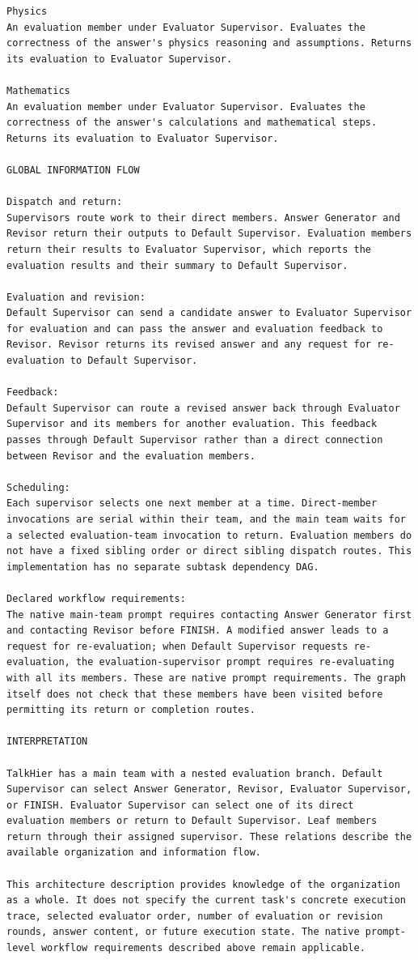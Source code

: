 \documentclass[10pt,letterpaper,twocolumn]{article}
\begin{document}
\begin{Verbatim}[fontsize=\small,breaklines=true,breakanywhere=true]
Physics
An evaluation member under Evaluator Supervisor. Evaluates the correctness of the answer's physics reasoning and assumptions. Returns its evaluation to Evaluator Supervisor.

Mathematics
An evaluation member under Evaluator Supervisor. Evaluates the correctness of the answer's calculations and mathematical steps. Returns its evaluation to Evaluator Supervisor.

GLOBAL INFORMATION FLOW

Dispatch and return:
Supervisors route work to their direct members. Answer Generator and Revisor return their outputs to Default Supervisor. Evaluation members return their results to Evaluator Supervisor, which reports the evaluation results and their summary to Default Supervisor.

Evaluation and revision:
Default Supervisor can send a candidate answer to Evaluator Supervisor for evaluation and can pass the answer and evaluation feedback to Revisor. Revisor returns its revised answer and any request for re-evaluation to Default Supervisor.

Feedback:
Default Supervisor can route a revised answer back through Evaluator Supervisor and its members for another evaluation. This feedback passes through Default Supervisor rather than a direct connection between Revisor and the evaluation members.

Scheduling:
Each supervisor selects one next member at a time. Direct-member invocations are serial within their team, and the main team waits for a selected evaluation-team invocation to return. Evaluation members do not have a fixed sibling order or direct sibling dispatch routes. This implementation has no separate subtask dependency DAG.

Declared workflow requirements:
The native main-team prompt requires contacting Answer Generator first and contacting Revisor before FINISH. A modified answer leads to a request for re-evaluation; when Default Supervisor requests re-evaluation, the evaluation-supervisor prompt requires re-evaluating with all its members. These are native prompt requirements. The graph itself does not check that these members have been visited before permitting its return or completion routes.

INTERPRETATION

TalkHier has a main team with a nested evaluation branch. Default Supervisor can select Answer Generator, Revisor, Evaluator Supervisor, or FINISH. Evaluator Supervisor can select one of its direct evaluation members or return to Default Supervisor. Leaf members return through their assigned supervisor. These relations describe the available organization and information flow.

This architecture description provides knowledge of the organization as a whole. It does not specify the current task's concrete execution trace, selected evaluator order, number of evaluation or revision rounds, answer content, or future execution state. The native prompt-level workflow requirements described above remain applicable.

\end{Verbatim}
\end{document}
